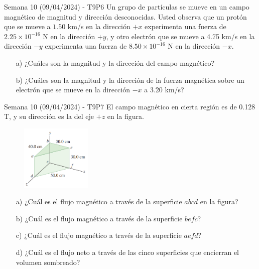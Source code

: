 \begin{frame}{Semana 10 (09/04/2024) - T9P6}
    Un grupo de partículas se mueve en un campo magnético de magnitud y dirección desconocidas. Usted observa que un protón
que se mueve a $1.50$ km/s en la dirección $+x$ experimenta una fuerza
de $2.25 \times 10^{-16}$ N en la dirección $+y$, y otro electrón que se mueve a
4.75 km/s en la dirección $-y$ experimenta una fuerza de $8.50 \times 10^{-16}$ N
en la dirección $-x$.
\begin{itemize}
    \item[a)] ¿Cuáles son la magnitud y la dirección del
campo magnético?
    \item[b)] ¿Cuáles son la magnitud y la dirección de la
fuerza magnética sobre un electrón que se mueve en la dirección $-x$
a 3.20 km/s?
\end{itemize}
\end{frame}

\begin{frame}{Semana 10 (09/04/2024) - T9P7}
    El campo magnético en cierta región es de 0.128 T, y su
dirección es la del eje $+z$ en la
figura.

\begin{figure}
    \centering
    \includegraphics[width=0.3\textwidth]{figures/t9p7.png}
\end{figure}

\begin{itemize}
    \item[a)] ¿Cuál es el flujo
magnético a través de la superficie
$abcd$ en la figura?
    \item[b)] ¿Cuál es el
flujo magnético a través de la
superficie $befc$?
    \item[c)] ¿Cuál es el flujo
magnético a través de la superficie
$aefd$?
    \item[d)] ¿Cuál es el flujo neto a
través de las cinco superficies que
encierran el volumen sombreado?
\end{itemize}
\end{frame}

